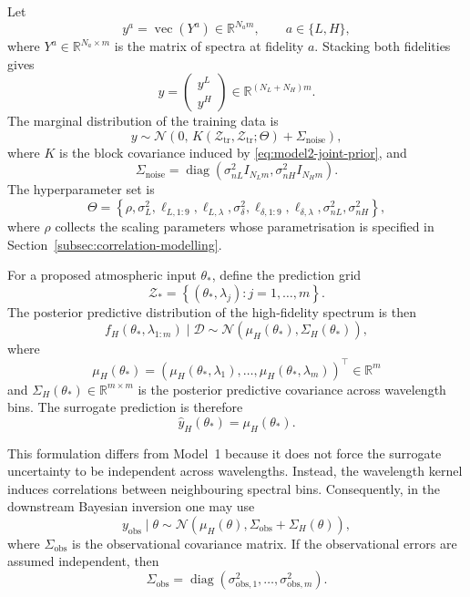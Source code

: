 \documentclass[11pt,a4paper]{article}
\begin{document}
Let
\[
    y^a = \operatorname{vec}(Y^a)\in\mathbb R^{N_a m},
    \qquad
    a\in\{L,H\},
\]
where \(Y^a\in\mathbb R^{N_a\times m}\) is the matrix of spectra at fidelity
\(a\). Stacking both fidelities gives
\[
    y
    =
    \begin{pmatrix}
    y^L\\
    y^H
    \end{pmatrix}
    \in \mathbb R^{(N_L+N_H)m}.
\]
The marginal distribution of the training data is
\[
    y
    \sim
    \mathcal N
    \left(
    0,\,
    K(\mathcal Z_{\mathrm{tr}},\mathcal Z_{\mathrm{tr}};\Theta)
    +
    \Sigma_{\mathrm{noise}}
    \right),
\]
where \(K\) is the block covariance induced by
\eqref{eq:model2-joint-prior}, and
\[
    \Sigma_{\mathrm{noise}}
    =
    \operatorname{diag}
    \left(
    \sigma^2_{nL}I_{N_L m},
    \sigma^2_{nH}I_{N_H m}
    \right).
\]
The hyperparameter set is
\[
    \Theta
    =
    \left\{
    \rho,
    \sigma^2_L,
    \ell_{L,1:9},
    \ell_{L,\lambda},
    \sigma^2_\delta,
    \ell_{\delta,1:9},
    \ell_{\delta,\lambda},
    \sigma^2_{nL},
    \sigma^2_{nH}
    \right\},
\]
where \(\rho\) collects the scaling parameters whose parametrisation is
specified in Section~\ref{subsec:correlation-modelling}.

For a proposed atmospheric input \(\theta_\ast\), define the prediction
grid
\[
    \mathcal Z_\ast
    =
    \left\{
    (\theta_\ast,\lambda_j):
    j=1,\ldots,m
    \right\}.
\]
The posterior predictive distribution of the high-fidelity spectrum is
then
\[
    f_H(\theta_\ast,\lambda_{1:m})\mid\mathcal D
    \sim
    \mathcal N
    \left(
    \mu_H(\theta_\ast),
    \Sigma_H(\theta_\ast)
    \right),
\]
where
\[
    \mu_H(\theta_\ast)
    =
    \left(
    \mu_H(\theta_\ast,\lambda_1),
    \ldots,
    \mu_H(\theta_\ast,\lambda_m)
    \right)^\top
    \in\mathbb R^m
\]
and \(\Sigma_H(\theta_\ast)\in\mathbb R^{m\times m}\) is the posterior
predictive covariance across wavelength bins. The surrogate prediction is
therefore
\[
    \widehat y_H(\theta_\ast)
    =
    \mu_H(\theta_\ast).
\]

This formulation differs from Model~1 because it does not force the
surrogate uncertainty to be independent across wavelengths. Instead, the
wavelength kernel induces correlations between neighbouring spectral bins.
Consequently, in the downstream Bayesian inversion one may use
\[
    y_{\mathrm{obs}}\mid\theta
    \sim
    \mathcal N
    \left(
    \mu_H(\theta),
    \Sigma_{\mathrm{obs}}
    +
    \Sigma_H(\theta)
    \right),
    \label{eq:model2-likelihood}
\]
where \(\Sigma_{\mathrm{obs}}\) is the observational covariance matrix. If
the observational errors are assumed independent, then
\[
    \Sigma_{\mathrm{obs}}
    =
    \operatorname{diag}
    \left(
    \sigma^2_{\mathrm{obs},1},
    \ldots,
    \sigma^2_{\mathrm{obs},m}
    \right).
\]
\end{document}
